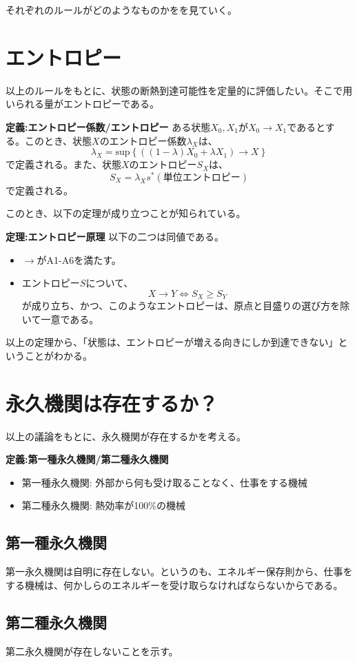 \documentclass[a3paper, twocolumn, 11pt]{jsarticle}
\begin{document}
それぞれのルールがどのようなものかをを見ていく。\\

\section{エントロピー}
以上のルールをもとに、状態の断熱到達可能性を定量的に評価したい。そこで用いられる量がエントロピーである。\\
\begin{itembox}[l]{\textbf{定義:エントロピー係数/エントロピー}}
    ある状態$X_0,X_1$が$X_0 \rightarrow X_1$であるとする。このとき、状態$X$のエントロピー係数$\lambda_X$は、
    \begin{equation}
        \lambda_X = \text{sup} \left\{ ((1-\lambda)X_0 + \lambda X_1) \rightarrow X \right\}
    \end{equation}
    で定義される。また、状態$X$のエントロピー$S_X$は、
    \begin{equation}
        S_X = \lambda_X s^*(\text{単位エントロピー})
    \end{equation}
    で定義される。
\end{itembox}
このとき、以下の定理が成り立つことが知られている。
\begin{itembox}[l]{\textbf{定理:エントロピー原理}}
    以下の二つは同値である。
    \begin{itemize}
        \item $\rightarrow$がA1-A6を満たす。
        \item エントロピー$S$について、
        \begin{equation}
            X \rightarrow Y \Leftrightarrow S_X \geq S_Y
        \end{equation}
        が成り立ち、かつ、このようなエントロピーは、原点と目盛りの選び方を除いて一意である。
    \end{itemize}
\end{itembox}
以上の定理から、「状態は、エントロピーが増える向きにしか到達できない」ということがわかる。\\

\section{永久機関は存在するか？}
以上の議論をもとに、永久機関が存在するかを考える。
\begin{itembox}[l]{\textbf{定義:第一種永久機関/第二種永久機関}}
    \begin{itemize}
        \item 第一種永久機関: 外部から何も受け取ることなく、仕事をする機械
        \item 第二種永久機関: 熱効率が100\%の機械
    \end{itemize}
\end{itembox}

\subsection{第一種永久機関}
第一永久機関は自明に存在しない。というのも、エネルギー保存則から、仕事をする機械は、何かしらのエネルギーを受け取らなければならないからである。\\

\subsection{第二種永久機関}
第二永久機関が存在しないことを示す。
\end{document}
